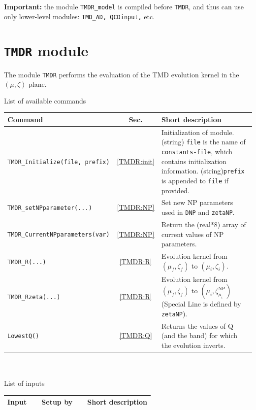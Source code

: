 \documentclass[prd,nofootinbib,eqsecnum,final]{revtex4}
\renewcommand{\(}{\left(}
\renewcommand{\)}{\right)}
\renewcommand{\[}{\left[}
\renewcommand{\]}{\right]}
\newcommand{\blue}[1]{{\color{blue} #1}}
\begin{document}
\vspace{2mm}

\textbf{Important:} the module \texttt{TMDR\_model} is compiled before \texttt{TMDR}, and thus can use only lower-level modules: \texttt{TMD\_AD, QCDinput,} etc.

\newpage

\section{\texttt{TMDR} module}
\label{TMDR}

The module \texttt{TMDR} performs the evaluation of the TMD evolution kernel in the $(\mu,\zeta)$-plane. 

\begin{center}
List of available commands
\\
\begin{tabular}{||l|c|p{10cm}||}
\hline\hline
Command & ~~Sec.~~ & Short description
\\\hline
\texttt{TMDR{\_}Initialize(file,\blue{prefix}) } & \ref{TMDR:init} & Initialization of module. (string) \texttt{file} is the name of \texttt{constants-file}, which contains initialization information. (string)\texttt{prefix} is appended to \texttt{file} if provided.
\\\hline
\texttt{TMDR{\_}setNPparameter(...) } & \ref{TMDR:NP}& Set new NP parameters used in \texttt{DNP} and \texttt{zetaNP}.
\\\hline
\texttt{TMDR\_CurrentNPparameters(var)} & \ref{TMDR:NP} & Return the (real*8) array of current values of NP parameters.
\\\hline
\texttt{TMDR{\_}R(...)} & \ref{TMDR:R} &Evolution kernel from $(\mu_f,\zeta_f)$ to $(\mu_i,\zeta_i)$.
\\\hline
\texttt{TMDR{\_}Rzeta(...)} & \ref{TMDR:R}&  Evolution kernel from $(\mu_f,\zeta_f)$ to $(\mu_i,\zeta^{\text{NP}}_{\mu_i})$ (Special Line is defined by \texttt{zetaNP}).
\\\hline
\texttt{LowestQ()} & \ref{TMDR:Q}&  Returns the values of Q (and the band) for which the evolution inverts.
\\
\hline\hline
\end{tabular}
\\
~
\\
List of inputs
\\
\begin{tabular}{||l|c|p{10cm}||}
\hline\hline
Input & ~~Setup by~~ & Short description
\\\hline

\end{tabular}
\end{center}
\end{document}
